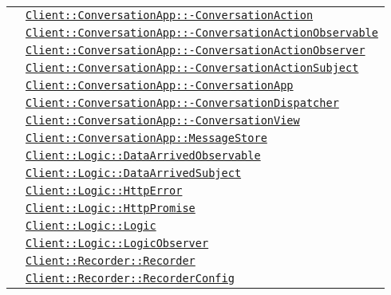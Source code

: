 \begin{longtable}{|>{\centering}m{3cm}|m{10cm}<{\centering}|}
& \hyperref[Client::ConversationApp::ConversationAction]{\texttt{Client::ConversationApp::-\linebreak ConversationAction}}\\
& \hyperref[Client::ConversationApp::ConversationActionObservable]{\texttt{Client::ConversationApp::-\linebreak ConversationActionObservable}}\\
& \hyperref[Client::ConversationApp::ConversationActionObserver]{\texttt{Client::ConversationApp::-\linebreak ConversationActionObserver}}\\
& \hyperref[Client::ConversationApp::ConversationActionSubject]{\texttt{Client::ConversationApp::-\linebreak ConversationActionSubject}}\\
& \hyperref[Client::ConversationApp::ConversationApp]{\texttt{Client::ConversationApp::-\linebreak ConversationApp}}\\
& \hyperref[Client::ConversationApp::ConversationDispatcher]{\texttt{Client::ConversationApp::-\linebreak ConversationDispatcher}}\\
& \hyperref[Client::ConversationApp::ConversationView]{\texttt{Client::ConversationApp::-\linebreak ConversationView}}\\
& \hyperref[Client::ConversationApp::MessageStore]{\texttt{Client::ConversationApp::MessageStore}}\\
& \hyperref[Client::Logic::DataArrivedObservable]{\texttt{Client::Logic::DataArrivedObservable}}\\
& \hyperref[Client::Logic::DataArrivedSubject]{\texttt{Client::Logic::DataArrivedSubject}}\\
& \hyperref[Client::Logic::HttpError]{\texttt{Client::Logic::HttpError}}\\
& \hyperref[Client::Logic::HttpPromise]{\texttt{Client::Logic::HttpPromise}}\\
& \hyperref[Client::Logic::Logic]{\texttt{Client::Logic::Logic}}\\
& \hyperref[Client::Logic::LogicObserver]{\texttt{Client::Logic::LogicObserver}}\\
& \hyperref[Client::Recorder::Recorder]{\texttt{Client::Recorder::Recorder}}\\
& \hyperref[Client::Recorder::RecorderConfig]{\texttt{Client::Recorder::RecorderConfig}}\\

\end{longtable}
